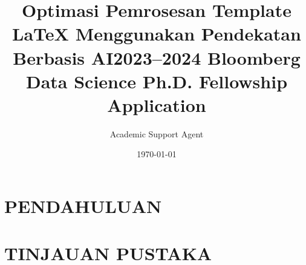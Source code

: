 \documentclass{article}
\title{Optimasi Pemrosesan Template LaTeX Menggunakan Pendekatan Berbasis AI}
\author{Academic Support Agent}
\date{\today}
\begin{document}
\maketitle

\begin{abstract}

\end{abstract}

\chapter{PENDAHULUAN}


\chapter{TINJAUAN PUSTAKA}


\usepackage[utf8]{inputenc}
\usepackage{url}
\usepackage{hyperref}
\usepackage{amsmath}
\usepackage{amsfonts}
\usepackage{amssymb}
\usepackage{graphicx}
\usepackage{float}
\usepackage{lipsum}
\usepackage{multicol}
\usepackage{xcolor}
\usepackage{natbib}
\usepackage[font=small]{caption}
\addtolength{\abovecaptionskip}{-3mm}
\addtolength{\textfloatsep}{-5mm}
\setlength\columnsep{20pt}

\usepackage[a4paper,left=1.50cm, right=1.50cm, top=1.50cm, bottom=1.50cm]{geometry}


\author{}

\title{2023--2024 Bloomberg Data Science Ph.D. Fellowship Application}
\end{document}
